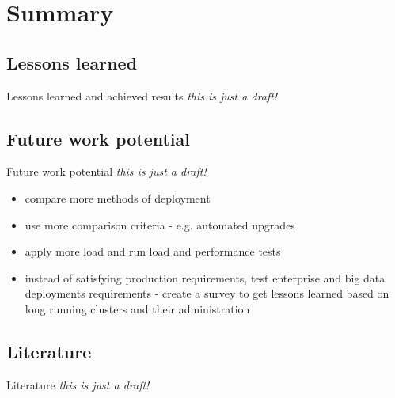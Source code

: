 \documentclass{beamer}
\begin{document}
\section{Summary}
\subsection{Lessons learned}
\begin{frame}{Lessons learned and achieved results}%
	\textit{this is just a draft!}
\end{frame}
\subsection{Future work potential}
\begin{frame}{Future work potential}%
	\textit{this is just a draft!}
\begin{itemize}
	\item compare more methods of deployment
	\item use more comparison criteria - e.g. automated upgrades
	\item apply more load and run load and performance tests
	\item instead of satisfying production requirements, test enterprise and big data deployments requirements - create a survey to get lessons learned based on long running clusters and their administration
\end{itemize}
\end{frame}
\subsection{Literature}
\begin{frame}{Literature}%
	\textit{this is just a draft!}

\end{frame}
\end{document}
